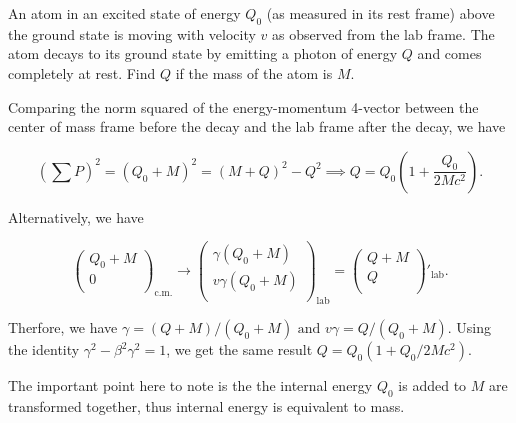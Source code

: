 \documentclass[english,a4paper,12pt]{report}
\begin{document}
{An atom in an excited state of energy \(Q_0 \) (as measured in its rest frame) above the ground state is moving with velocity \(v\) as observed from the lab frame. The atom decays to its ground state by emitting a photon of energy \(Q\) and comes completely at rest. Find \(Q\) if the mass of the atom is \(M\).}
{Comparing the norm squared of the energy-momentum 4-vector between the center of mass frame before the decay and the lab frame after the decay, we have

\begin{equation}
    \left( \sum P \right)^2 = (Q_0 + M)^2 = (M + Q)^2 - Q^2 \implies Q = Q_0 \left( 1 + \frac{Q_0 }{2Mc^2} \right).
\end{equation}

Alternatively, we have

\begin{equation}
    \begin{pmatrix}
         Q_0 + M \\
         0 \\
    \end{pmatrix}_{\text{c.m.} }  \rightarrow \begin{pmatrix}
         \gamma (Q_0 + M) \\
         v \gamma (Q_0 + M) \\
    \end{pmatrix}_{\text{lab} } = \begin{pmatrix}
         Q + M \\
         Q \\
    \end{pmatrix}'_{\text{lab} }.
\end{equation}

Therfore, we have \(\gamma = (Q+M) /(Q_0 +M) \text { and } v\gamma = Q /(Q_0 +M)\). Using the identity \(\gamma ^2- \beta ^2\gamma ^2 = 1\), we get the same result \(Q = Q_0 \left( 1 + Q_0 /2Mc^2 \right)\).

The important point here to note is the the internal energy \(Q_0 \) is added to \(M\) are transformed together, thus internal energy is equivalent to mass.  
} 
\end{document}
